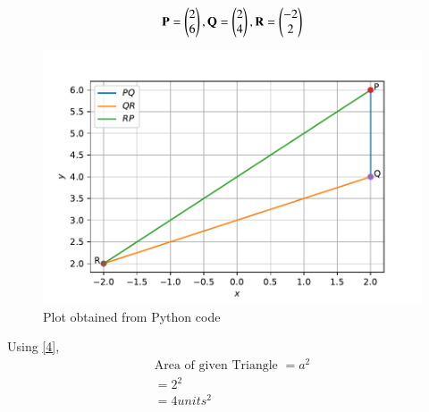 \documentclass[journal,12pt,twocolumn]{IEEEtran}
\renewcommand\thesection{\arabic{section}}
\begin{document}
\begin{enumerate}[label=\thesection.\arabic*.,ref=\thesection.\theenumi]
\begin{align}
\mathbf{P}=\begin{pmatrix}2\\6\end{pmatrix},\mathbf{Q}=\begin{pmatrix}2\\4\end{pmatrix},\mathbf{R}=\begin{pmatrix}-2\\2\end{pmatrix}
\end{align}

\begin{figure}[h]
	\centering
	\includegraphics[width=\columnwidth]{Figure_1.pdf}
	\caption{Plot obtained from Python code}
	\label{Fig:3.1}
\end{figure}

Using \eqref{4},
\begin{align}
\text{Area of given Triangle }=a^2\\=2^2\\=4 units^2
\end{align}

\end{enumerate}
\end{document}
